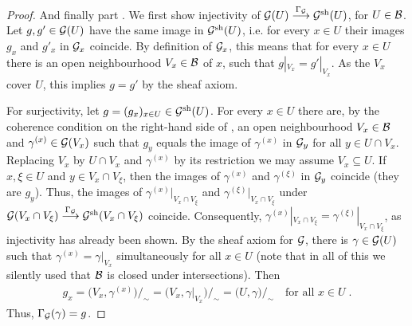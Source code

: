 \documentclass[a4paper,parskip=half,numbers=enddot, DIV=12]{scrreprt}
\begin{document}
\begin{proof}
	And finally part . We first show injectivity of $\Gg(U)\morphism[\Gamma_\Gg] \Gg^\sh(U)$, for $U\in \mathcal{B}$. Let $g,g'\in \mathcal{G}(U)$ have the same image in $\mathcal{G}^{\mathrm{sh}}(U)$, i.e. for every $x\in U$ their images $g_x$ and $g'_x$ in $\mathcal{G}_x$ coincide. By definition of $\mathcal{G}_x$, this means that for every $x\in U$ there is an open neighbourhood $V_x\in\mathcal{B}$ of $x$, such that $g|_{V_x}=g'|_{V_x}$. As the $V_x$ cover $U$, this implies $g=g'$ by the sheaf axiom.
	
	For surjectivity, let $g=(g_x)_{x\in U}\in \mathcal{G}^{\mathrm{sh}}(U)$. For every $x\in U$ there are, by the coherence condition on the right-hand side of , an open neighbourhood $V_x\in\mathcal{B}$ and $\gamma^{(x)}\in \mathcal{G}(V_x)$ such that $g_y$ equals the image of $\gamma^{(x)}$ in $\mathcal{G}_y$ for all $y\in U\cap V_x$. Replacing $V_x$ by $U\cap V_x$ and $\gamma^{(x)}$ by its restriction we may assume $V_x\subseteq U$. If $x,\xi\in U$ and $y\in V_x\cap V_\xi$, then the images of $\gamma^{(x)}$ and $\gamma^{(\xi)}$ in $\mathcal{G}_y$ coincide (they are $g_y$). Thus, the images of $\gamma^{(x)}|_{V_x\cap V_\xi}$ and $ \gamma^{(\xi)}|_{V_x\cap V_\xi}$ under $\Gg(V_x\cap V_\xi ) \morphism[\Gamma_\Gg] \Gg^\sh(V_x\cap V_\xi)$ coincide. Consequently,  $\gamma^{(x)}|_{V_x\cap V_\xi} = \gamma^{(\xi)}|_{V_x\cap V_\xi}$, as injectivity has already been shown. By the sheaf axiom for $\mathcal{G}$, there is $\gamma\in \mathcal{G}(U)$ such that $\gamma^{(x)}=\gamma|_{V_x}$ simultaneously for all $x\in U$ (note that in all of this we silently used that $\mathcal{B}$ is closed under intersections). Then 
	\begin{align*}
		g_x=\big(V_x, \gamma^{(x)}\big)/_\sim = \big(V_x,\gamma|_{V_x}\big)/_\sim = \big(U,\gamma\big)/_\sim\quad\text{for all }x\in U\;. 
	\end{align*}
	Thus, $\Gamma_{\mathcal{G}}(\gamma) = g$.
\end{proof}
\end{document}

